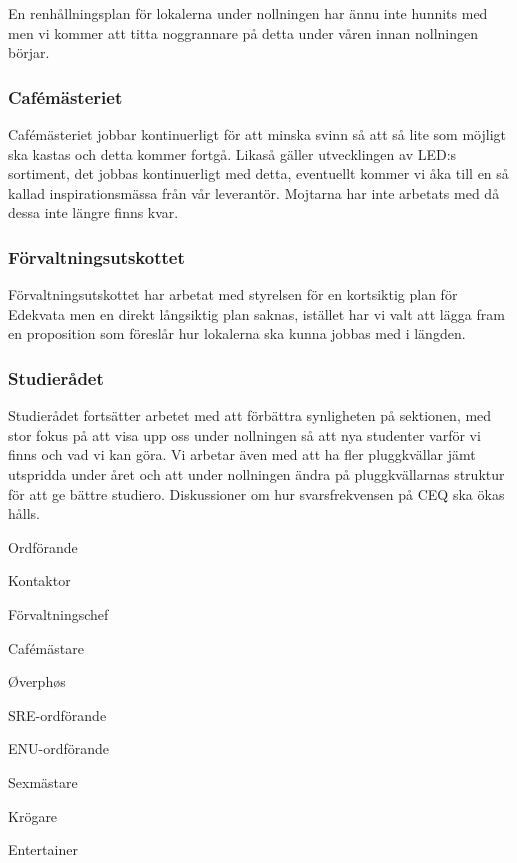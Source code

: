 \documentclass[../_main/handlingar.tex]{subfiles}
\begin{document}
En renhållningsplan för lokalerna under nollningen har ännu inte hunnits med men vi kommer att titta noggrannare på detta under våren innan nollningen börjar.

\subsubsection*{Cafémästeriet}
Cafémästeriet jobbar kontinuerligt för att minska svinn så att så lite som möjligt ska kastas och detta kommer fortgå. Likaså gäller utvecklingen av LED:s sortiment, det jobbas kontinuerligt med detta, eventuellt kommer vi åka till en så kallad inspirationsmässa från vår leverantör. Mojtarna har inte arbetats med då dessa inte längre finns kvar.

\subsubsection*{Förvaltningsutskottet}
Förvaltningsutskottet har arbetat med styrelsen för en kortsiktig plan för Edekvata men en direkt långsiktig plan saknas, istället har vi valt att lägga fram en proposition som föreslår hur lokalerna ska kunna jobbas med i längden.

\subsubsection*{Studierådet}
Studierådet fortsätter arbetet med att förbättra synligheten på sektionen, med stor fokus på att visa upp oss under nollningen så att nya studenter varför vi finns och vad vi kan göra. Vi arbetar även med att ha fler pluggkvällar jämt utspridda under året och att under nollningen ändra på pluggkvällarnas struktur för att ge bättre studiero. Diskussioner om hur svarsfrekvensen på CEQ ska ökas hålls.

\newpage
\begin{signatures}{10}
    \mvh
    \signature{Fredrik Peterson}{Ordförande}
    \signature{Erik Månsson}{Kontaktor}
    \signature{Anders Nilsson}{Förvaltningschef}
    \signature{Stephanie Mirsky}{Cafémästare}
    \signature{Molly Rusk}{Øverphøs}
    \signature{Johan Persson}{SRE-ordförande}
    \signature{Johannes Koch}{ENU-ordförande}
    \signature{Martin Gemborn Nilsson}{Sexmästare}
    \signature{Malin Lindström}{Krögare}
    \signature{Dalia Khairallah}{Entertainer}
\end{signatures}
\end{document}
